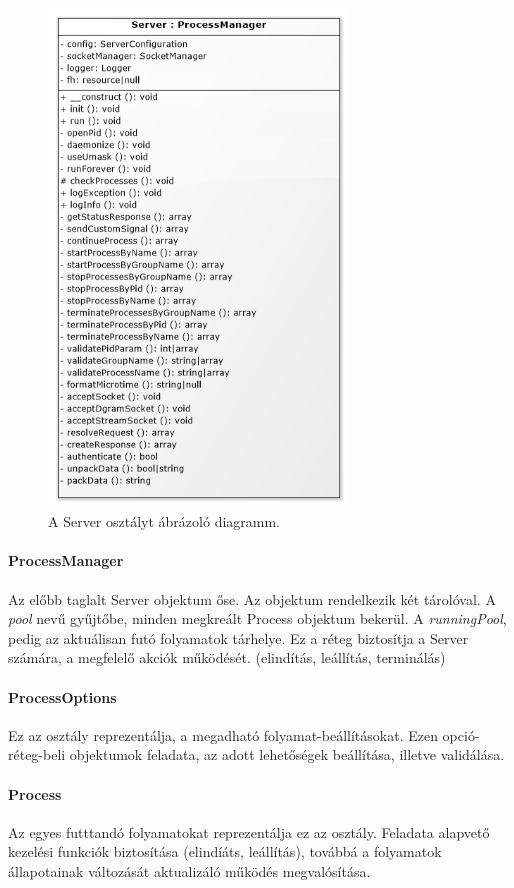 \documentclass[12pt]{report}
\begin{document}
    \begin{figure}[ht]
       \centering
         \includegraphics[width=8cm]{pics/serv.png}
	  \caption{A Server osztályt ábrázoló diagramm.}
  \end{figure}
  
  \paragraph{ProcessManager}
  Az előbb taglalt Server objektum őse. Az objektum rendelkezik két tárolóval. A \textit{pool} nevű gyűjtőbe, minden megkreált Process objektum bekerül. A \textit{runningPool}, pedig az aktuálisan futó folyamatok tárhelye. Ez a réteg biztosítja a Server számára, a megfelelő akciók működését. (elindítás, leállítás, terminálás)
  \paragraph{ProcessOptions}
  Ez az osztály reprezentálja, a megadható folyamat-beállításokat. Ezen opció-réteg-beli objektumok feladata, az adott lehetőségek beállítása, illetve validálása.
  \paragraph{Process}
  Az egyes futttandó folyamatokat reprezentálja ez az osztály. Feladata alapvető kezelési funkciók biztosítása (elindíáts, leállítás), továbbá a folyamatok állapotainak változását aktualizáló működés megvalósítása.
  
\end{document}
